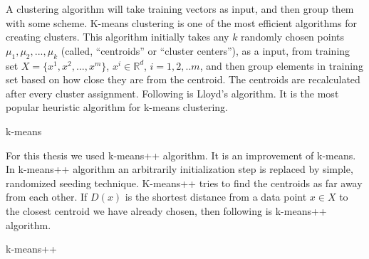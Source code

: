 \documentclass[12pt,oneside,a4paper]{article}
\begin{document}
A clustering algorithm will take training vectors as input, and then group them with some scheme. K-means\cite{k-means-clustering} clustering is one of the most efficient algorithms for creating clusters. This algorithm initially takes any $k$ randomly chosen points $\mu_{1}, \mu_{2}, ..., \mu_{k}$ (called, ``centroids'' or ``cluster centers''), as a input, from training set $X = \{x^{1}, x^{2}, ..., x^{m}\}$, $x^{i} \in \mathbb{R}^d$, $i= {1,2, ..m}$, and then group elements in training set based on how close they are from the centroid. The centroids are recalculated after every cluster assignment. Following is Lloyd's algorithm. It is the most popular heuristic algorithm for k-means clustering.

\begin{algorithm}[H]
\caption{k-means}\label{k-means}
\begin{algorithmic}[1]
  \Repeat
\end{algorithmic}
\end{algorithm}

For this thesis we used k-means++ algorithm. It is an improvement of k-means. In k-means++ algorithm an arbitrarily initialization step is replaced by simple, randomized seeding technique. K-means++ tries to find the centroids as far away from each other. If $D(x)$ is the shortest distance from a data point $x \in X$ to the closest centroid we have already chosen, then following is k-means++ algorithm\cite{k-means++}.

\begin{algorithm}[H]
\caption{k-means++}\label{k-means++}
\begin{algorithmic}[1]
\end{algorithmic}
\end{algorithm}
\end{document}
